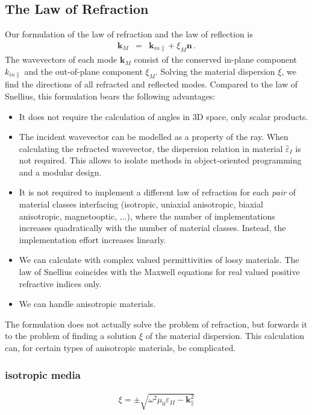 \documentclass[12pt,a4paper,twoside,openright,BCOR10mm,headsepline,titlepage,abstracton,chapterprefix,final]{scrreprt}
\newcommand\Vector[1]{{\mathbf{#1}}}
\newcommand\vacuum{0}
\newcommand\wavenumber{k}
\newcommand\Wavevector{\Vector{\wavenumber}}
\newcommand\Tensor[1]{\hat{#1}}
\newcommand\vacuumpermeability{\scalarpermeability_{\vacuum}}
\newcommand\scalarpermeability{\mu}
\newcommand\permittivity{\Tensor{\scalarpermittivity}}
\newcommand\scalarpermittivity{\varepsilon}
\newcommand\materialone{I}
\newcommand\materialtwo{{II}}
\begin{document}
\subsection{The Law of Refraction}
Our formulation of the law of refraction and the law of reflection is
\begin{eqnarray}
 \Wavevector_{M} &=& \Wavevector_{in\parallel} + \xi_M \Vector{n}\,.\label{eq:xieqn}
\end{eqnarray}
The wavevectors of each mode $\Wavevector_M$ consist of the conserved in-plane component $\wavenumber_{in\parallel}$ and the out-of-plane component $\xi_M$. 
Solving the material dispersion $\xi$, we find the directions of all refracted and reflected modes.
Compared to the law of Snellius, this formulation bears the following advantages:
\begin{itemize}
 \item It does not require the calculation of angles in 3D space, only scalar products.
 \item The incident wavevector can be modelled as a property of the ray. When calculating the refracted wavevector, 
       the dispersion relation in material $\permittivity_\materialone$ is not required.
       This allows to isolate methods in object-oriented programming and a modular design.
 \item It is not required to implement a different law of refraction for each \emph{pair} of material classes interfacing 
       (isotropic, uniaxial anisotropic, biaxial anisotropic, magnetooptic, ...),
       where the number of implementations increases quadratically with the number of material classes.
       Instead, the implementation effort increases linearly.
 \item We can calculate with complex valued permittivities of lossy materials.
       The law of Snellius coincides with the Maxwell equations for real valued positive refractive indices only.
 \item We can handle anisotropic materials.
\end{itemize}
The formulation does not actually solve the problem of refraction, but forwards it to the problem of finding a solution $\xi$ of the material dispersion. 
This calculation can, for certain types of anisotropic materials, be complicated.

\subsubsection{isotropic media}
\begin{align}
 \xi = \pm \sqrt{\omega^2 \vacuumpermeability \scalarpermittivity_\materialtwo - \Wavevector_{\parallel}^2}
\end{align}
\end{document}
